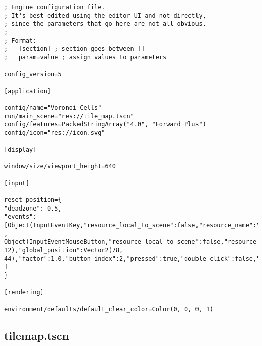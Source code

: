 \begin{lstlisting}
; Engine configuration file.
; It's best edited using the editor UI and not directly,
; since the parameters that go here are not all obvious.
;
; Format:
;   [section] ; section goes between []
;   param=value ; assign values to parameters

config_version=5

[application]

config/name="Voronoi Cells"
run/main_scene="res://tile_map.tscn"
config/features=PackedStringArray("4.0", "Forward Plus")
config/icon="res://icon.svg"

[display]

window/size/viewport_height=640

[input]

reset_position={
"deadzone": 0.5,
"events": [Object(InputEventKey,"resource_local_to_scene":false,"resource_name":"","device":-1,"window_id":0,"alt_pressed":false,"shift_pressed":false,"ctrl_pressed":false,"meta_pressed":false,"pressed":false,"keycode":71,"physical_keycode":0,"key_label":0,"unicode":103,"echo":false,"script":null)
, Object(InputEventMouseButton,"resource_local_to_scene":false,"resource_name":"","device":-1,"window_id":0,"alt_pressed":false,"shift_pressed":false,"ctrl_pressed":false,"meta_pressed":false,"button_mask":2,"position":Vector2(75, 12),"global_position":Vector2(78, 44),"factor":1.0,"button_index":2,"pressed":true,"double_click":false,"script":null)
]
}

[rendering]

environment/defaults/default_clear_color=Color(0, 0, 0, 1)
\end{lstlisting}

\subsection{tile\textunderscore{}map.tscn}

